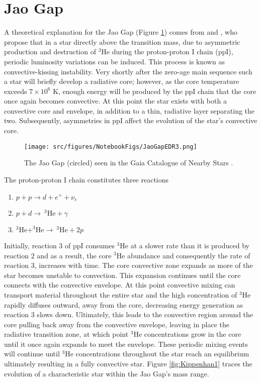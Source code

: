 \section{Jao Gap}\label{sec:JaoGap}
A theoretical explanation for the Jao Gap (Figure \ref{fig:JaoGap}) comes from
\citet{van2012} and \citet{MacDonald2018}, who propose that in a star directly above the transition mass,
due to asymmetric production and destruction of $^{3}$He during the
proton-proton I chain (ppI), periodic luminosity variations can be induced.
This process is known as convective-kissing instability. Very shortly after the
zero-age main sequence such a star will briefly develop a radiative core;
however, as the core temperature exceeds $7\times 10^{6}$ K, enough energy will
be produced by the ppI chain that the core once again becomes convective. At
this point the star exists with both a convective core and envelope, in
addition to a thin, radiative layer separating the two. Subsequently,
asymmetries in ppI affect the evolution of the star's convective core.

\begin{figure}
	\centering
	\texttt{[image: src/figures/NotebookFigs/JaoGapEDR3.png]}
	\caption{The Jao Gap (circled) seen in the Gaia Catalogue of Nearby Stars \citep{GaiaCollaboration2021}.}
	\label{fig:JaoGap}
\end{figure}

The proton-proton I chain constitutes three reactions 
\begin{enumerate} 
	\item $p + p \longrightarrow d + e^{+} + \nu_{e}$
	\item $p + d \longrightarrow \ ^{3}\text{He} + \gamma$
	\item $^{3}\text{He} + ^{3}\text{He} \longrightarrow \ ^{3}\text{He} + 2p$ 
\end{enumerate} 
Initially, reaction 3 of ppI consumes $^{3}$He at a slower rate than it is
produced by reaction 2 and as a result, the core $^{3}$He abundance and
consequently the rate of reaction 3, increases with time. The core convective
zone expands as more of the star becomes unstable to convection. This expansion
continues until the core connects with the convective envelope. At this point
convective mixing can transport material throughout the entire star and the
high concentration of $^{3}$He rapidly diffuses outward, away from the core,
decreasing energy generation as reaction 3 slows down. Ultimately, this leads
to the convective region around the core pulling back away from the convective
envelope, leaving in place the radiative transition zone, at which point
$^{3}$He concentrations grow in the core until it once again expands to meet
the envelope.  These periodic mixing events will continue until $^{3}$He
concentrations throughout the star reach an equilibrium ultimately resulting in
a fully convective star. Figure \ref{fig:Kippenhan1} traces the evolution of a
characteristic star within the Jao Gap's mass range.

